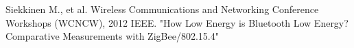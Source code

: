 \documentclass[journal]{IEEEtran}
\begin{document}

\IEEEpeerreviewmaketitle







\ifCLASSOPTIONcaptionsoff
  \newpage
\fi

\begin{thebibliography}{1}
Siekkinen M., et al. Wireless Communications and Networking Conference Workshops (WCNCW), 2012 IEEE.
"How Low Energy is Bluetooth Low Energy? Comparative Measurements with ZigBee/802.15.4"


\end{thebibliography}
\end{document}
